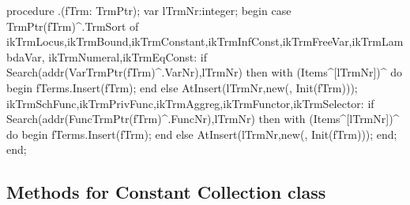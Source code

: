 \nwenddocs{}\endmoddef\nwstartdeflinemarkup\nwenddeflinemarkup
procedure .(fTrm: TrmPtr);
var
   lTrmNr:integer;
begin
   case TrmPtr(fTrm)^.TrmSort of
      ikTrmLocus,ikTrmBound,ikTrmConstant,ikTrmInfConst,ikTrmFreeVar,ikTrmLambdaVar,
      ikTrmNumeral,ikTrmEqConst:
         if Search(addr(VarTrmPtr(fTrm)^.VarNr),lTrmNr) then
            with (Items^[lTrmNr])^ do
               begin
                  fTerms.Insert(fTrm);
               end
         else AtInsert(lTrmNr,new(, Init(fTrm)));
      ikTrmSchFunc,ikTrmPrivFunc,ikTrmAggreg,ikTrmFunctor,ikTrmSelector:
         if Search(addr(FuncTrmPtr(fTrm)^.FuncNr),lTrmNr) then
            with (Items^[lTrmNr])^ do
         begin
            fTerms.Insert(fTrm);
         end
         else AtInsert(lTrmNr,new(, Init(fTrm)));
   end;
end;
\eatline
{}\nwendcode{}\nwdocspar
\subsection{Methods for Constant Collection class}

